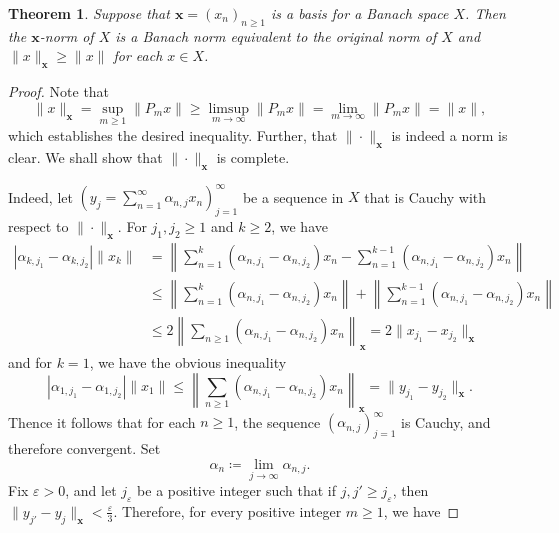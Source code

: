 \documentclass[11pt]{article}
\theoremstyle{thmstyle}
\newtheorem{theorem}{Theorem}[section]
\theoremstyle{defstyle}
\renewcommand{\le}{\leqslant}
\renewcommand{\ge}{\geqslant}
\begin{document}
\begin{theorem}
	Suppose that $\mathbf x = (x_n)_{n\ge 1}$ is a basis for a Banach space $X$. Then the $\mathbf x$-norm of $X$ is a Banach norm equivalent to the original norm of $X$ and $\|x\|_{\mathbf{x}}\ge\|x\|$ for each $x\in X$.
\end{theorem}
\begin{proof}
	Note that 
	\begin{equation*}
		\|x\|_{\mathbf x} = \sup_{m\ge 1}\|P_m x\|\ge\limsup_{m\to\infty}\|P_m x\| = \lim_{m\to\infty}\|P_m x\| = \|x\|,
	\end{equation*}
	which establishes the desired inequality. Further, that $\|\cdot\|_{\mathbf x}$ is indeed a norm is clear. We shall show that $\|\cdot\|_{\mathbf x}$ is complete. 

	Indeed, let $\left(y_j = \displaystyle\sum_{n = 1}^\infty \alpha_{n, j}x_n\right)_{j = 1}^\infty$ be a sequence in $X$ that is Cauchy with respect to $\|\cdot\|_{\mathbf x}$. For $j_1, j_2\ge 1$ and $k\ge 2$, we have 
	\begin{align*}
		\left|\alpha_{k, j_1} - \alpha_{k, j_2}\right|\|x_k\| &= \left\|\sum_{n = 1}^k (\alpha_{n, j_1} - \alpha_{n, j_2})x_n - \sum_{n = 1}^{k - 1}(\alpha_{n, j_1} - \alpha_{n, j_2})x_n\right\|\\
		&\le\left\|\sum_{n = 1}^k (\alpha_{n, j_1} - \alpha_{n, j_2})x_n\right\| + \left\|\sum_{n = 1}^{k - 1}(\alpha_{n, j_1} - \alpha_{n, j_2})x_n\right\|\\
		&\le 2\left\|\sum_{n\ge 1}(\alpha_{n, j_1} - \alpha_{n, j_2})x_n\right\|_{\mathbf x} = 2\|x_{j_1} - x_{j_2}\|_{\mathbf x}
	\end{align*}
	and for $k = 1$, we have the obvious inequality 
	\begin{equation*}
		|\alpha_{1, j_1} - \alpha_{1, j_2}|\|x_1\|\le\left\|\sum_{n\ge 1}(\alpha_{n, j_1} - \alpha_{n, j_2})x_n\right\|_{\mathbf x} = \|y_{j_1} - y_{j_2}\|_{\mathbf x}.
	\end{equation*}
	Thence it follows that for each $n\ge 1$, the sequence $\left(\alpha_{n, j}\right)_{j = 1}^\infty$ is Cauchy, and therefore convergent. Set
	\begin{equation*}
		\alpha_n \coloneq\lim_{j\to\infty}\alpha_{n, j}.
	\end{equation*}
	Fix $\varepsilon > 0$, and let $j_\varepsilon$ be a positive integer such that if $j, j'\ge j_{\varepsilon}$, then $\|y_{j'} - y_j\|_{\mathbf x} < \frac{\varepsilon}{3}$. Therefore, for every positive integer $m\ge 1$, we have 

\end{proof}
\end{document}
